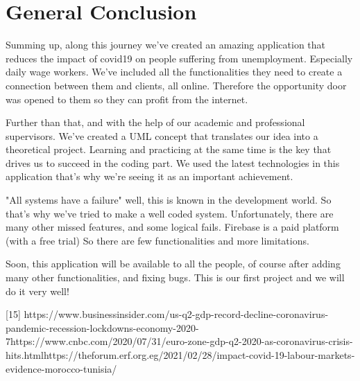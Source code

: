 \documentclass[12pt]{report}
\begin{document}
\chapter*{General Conclusion}
Summing up, along this journey we've created an amazing application that reduces the impact of covid19 on people suffering from unemployment. Especially daily wage workers.
We've included all the functionalities they need to create a connection between them and clients, all online.
Therefore the opportunity door was opened to them so they can profit from the internet.

Further than that, and with the help of our academic and professional supervisors. We've created a UML concept that translates our idea into a theoretical project.
Learning and practicing at the same time is the key that drives us to succeed in the coding part. We used the latest technologies in this application that's why we're seeing it as an important achievement.

"All systems have a failure" well, this is known in the development world. So that's why we've tried to make a well coded system.
Unfortunately, there are many other missed features, and some logical fails. Firebase is a paid platform (with a free trial) So there are few functionalities and more limitations.

Soon, this application will be available to all the people, of course after adding many other functionalities, and fixing bugs. This is our first project and we will do it very well!


\vspace{3cm}
[15] https://www.businessinsider.com/us-q2-gdp-record-decline-coronavirus-pandemic-recession-lockdowns-economy-2020-7\newline
[16] https://www.cnbc.com/2020/07/31/euro-zone-gdp-q2-2020-as-coronavirus-crisis-hits.html\newline
[17] https://theforum.erf.org.eg/2021/02/28/impact-covid-19-labour-markets-evidence-morocco-tunisia/
\end{document}
